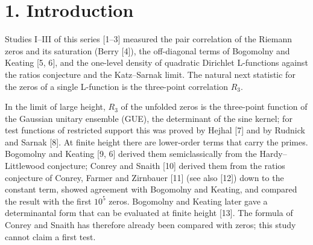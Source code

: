 \documentclass[
  10pt,
]{article}
\begin{document}
\begin{abstract}
\(\lambda_3 = 0.62 \pm 0.38\) together, consistent with both the formula
and GUE; about \(1.9\cdot10^5\) zeros near \(10^{21}\) would be needed
for an error of 0.2. As an addendum to study III, the quadratic
Dirichlet L-functions with \(10^{12} < |D| \le 10^{12} + 15{,}000\) and
two further bands of the same width (\(27{,}355\) L-functions, computed
for this study) follow the ratios conjecture (\(\chi^2\) per bin
0.87--1.21) and lie 15.4 standard errors above the Katz--Sarnak limit
near the central point (combined); over eight decades of the conductor
the excess falls only as \(1/\ln(|D|/\pi)\), as the ratios conjecture
predicts, a slowness of the kind Watkins found for cubic twists. All
numbers are checked by null models of the pipeline, a sensitivity
analysis and an independent recomputation that shares no code with the
main one; the agreement is numerical support for a conjecture, not a
proof of it.
\end{abstract}

\hypertarget{introduction}{%
\section{1. Introduction}\label{introduction}}

Studies I--III of this series {[}1--3{]} measured the pair correlation
of the Riemann zeros and its saturation (Berry {[}4{]}), the
off-diagonal terms of Bogomolny and Keating {[}5, 6{]}, and the
one-level density of quadratic Dirichlet L-functions against the ratios
conjecture and the Katz--Sarnak limit. The natural next statistic for
the zeros of a single L-function is the three-point correlation \(R_3\).

In the limit of large height, \(R_3\) of the unfolded zeros is the
three-point function of the Gaussian unitary ensemble (GUE), the
determinant of the sine kernel; for test functions of restricted support
this was proved by Hejhal {[}7{]} and by Rudnick and Sarnak {[}8{]}. At
finite height there are lower-order terms that carry the primes.
Bogomolny and Keating {[}9, 6{]} derived them semiclassically from the
Hardy--Littlewood conjecture; Conrey and Snaith {[}10{]} derived them
from the ratios conjecture of Conrey, Farmer and Zirnbauer {[}11{]} (see
also {[}12{]}) down to the constant term, showed agreement with
Bogomolny and Keating, and compared the result with the first \(10^5\)
zeros. Bogomolny and Keating later gave a determinantal form that can be
evaluated at finite height {[}13{]}. The formula of Conrey and Snaith
has therefore already been compared with zeros; this study cannot claim
a first test.
\end{document}

